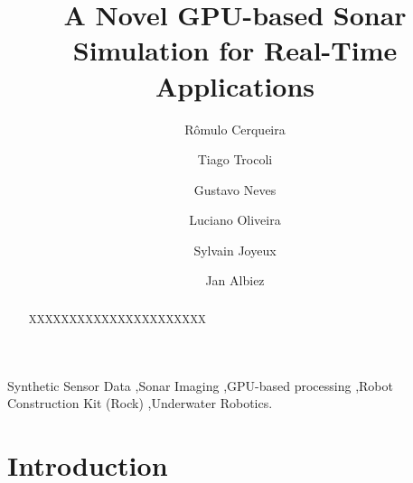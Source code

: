 \documentclass[final,5p,times]{elsarticle}
\begin{document}
\begin{frontmatter}



\title{A Novel GPU-based Sonar Simulation for Real-Time Applications}

\author[senai,ufba]{Rômulo Cerqueira}
\author[senai]{Tiago Trocoli}
\author[senai]{Gustavo Neves}
\author[ufba]{Luciano Oliveira}
\author[senai]{Sylvain Joyeux}
\author[senai,dfki]{Jan Albiez}

\address[senai]{Brazilian Institute of Robotics, SENAI CIMATEC, Salvador, Bahia, Brazil}
\address[ufba]{Intelligent Vision Research Lab, Federal University of Bahia, Salvador, Bahia, Brazil}
\address[dfki]{Robotics Innovation Center, DFKI GmbH, Bremen, Germany}

\begin{abstract}
XXXXXXXXXXXXXXXXXXXXXX
\end{abstract}

\begin{keyword}
Synthetic Sensor Data \sep Sonar Imaging  \sep GPU-based processing \sep Robot Construction Kit (Rock) \sep Underwater Robotics.

\end{keyword}

\end{frontmatter}

\linenumbers

\section{Introduction}
\label{introduction}
\end{document}
